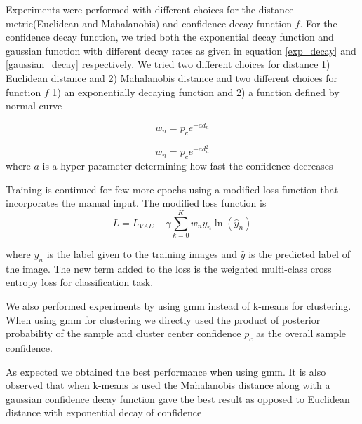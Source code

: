 \documentclass{uai2021} %
\begin{document}
Experiments were performed with different choices for the distance metric(Euclidean and Mahalanobis) and confidence decay function $f$.
For the confidence decay function, we tried both the exponential decay function and gaussian function with different decay rates as given in equation \ref{exp_decay} and \ref{gaussian_decay} respectively.
We tried two different choices for distance  1) Euclidean distance and 2) Mahalanobis distance and two different choices for function $f$ 1) an exponentially decaying function and  2) a function defined by normal curve

\begin{equation}
    w_n = p_ce^{-a d_n}
    \label{exp_decay}
\end{equation}


\begin{equation}
    w_n = p_ce^{-a d_n^2}
    \label{gaussian_decay}
\end{equation}
where $a$ is a hyper parameter determining how fast the confidence decreases


Training is continued for  few more epochs using a modified loss function that incorporates the manual input.
The modified loss function is
\begin{equation} \label{semi_supervised_loss}
L = L_{VAE}  - \gamma \sum_{k=0}^{K}w_{n}y_{n}\ln(\hat{y}_{n})
\end{equation}

where $y_n$ is the label given to the training images and $\hat{y}$ is the predicted label of the image.
The new term added to the loss is the weighted multi-class cross entropy loss for classification task.


We also performed experiments by using gmm instead of k-means for clustering.
When using gmm for clustering we directly used the product of posterior probability of the sample and cluster center confidence $p_c$ as the overall sample confidence.

As expected we obtained the best performance when using gmm.
It is also observed that when k-means is used the Mahalanobis distance along with a gaussian confidence decay function gave the best result as opposed to Euclidean distance with exponential decay of confidence
\end{document}
